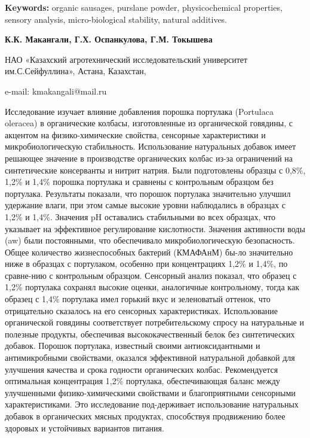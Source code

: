 {\bfseries Keywords:} organic sausages, purslane powder, physicochemical
properties, sensory analysis, micro-biological stability, natural
additives.

\begin{center}

{\bfseries К.К. Макангали\envelope, Г.Х. Оспанкулова, Г.М.
Токышева}

НАО «Казахский агротехнический исследовательский университет
им.С.Сейфуллина», Астана, Казахстан,

e-mail: kmakangali@mail.ru
\end{center}

Исследование изучает влияние добавления порошка портулака (Portulaca
oleracea) в органические колбасы, изготовленные из органической
говядины, с акцентом на физико-химические свойства, сенсорные
характеристики и микробиологическую стабильность. Использование
натуральных добавок имеет решающее значение в производстве органических
колбас из-за ограничений на синтетические консерванты и нитрит натрия.
Были подготовлены образцы с 0,8\%, 1,2\% и 1,4\% порошка портулака и
сравнены с контрольным образцом без портулака. Результаты показали, что
порошок портулака значительно улучшил удержание влаги, при этом самые
высокие уровни наблюдались в образцах с 1,2\% и 1,4\%. Значения pH
оставались стабильными во всех образцах, что указывает на эффективное
регулирование кислотности. Значения активности воды (aw) были
постоянными, что обеспечивало микробиологическую безопасность. Общее
количество жизнеспособных бактерий (КМАФАнМ) бы-ло значительно ниже в
образцах с портулаком, особенно при концентрациях 1,2\% и 1,4\%, по
сравне-нию с контрольным образцом. Сенсорный анализ показал, что образец
с 1,2\% портулака сохранял высокие оценки, аналогичные контрольному,
тогда как образец с 1,4\% портулака имел горький вкус и зеленоватый
оттенок, что отрицательно сказалось на его сенсорных характеристиках.
Использование органической говядины соответствует потребительскому
спросу на натуральные и полезные продукты, обеспечивая
высококачественный белок без синтетических добавок. Порошок портулака,
известный своими антиоксидантными и антимикробными свойствами, оказался
эффективной натуральной добавкой для улучшения качества и срока годности
органических колбас. Рекомендуется оптимальная концентрация 1,2\%
портулака, обеспечивающая баланс между улучшенными физико-химическими
свойствами и благоприятными сенсорными характеристиками. Это
исследование под-держивает использование натуральных добавок в
органических мясных продуктах, способствуя продвижению более здоровых и
устойчивых вариантов питания.

